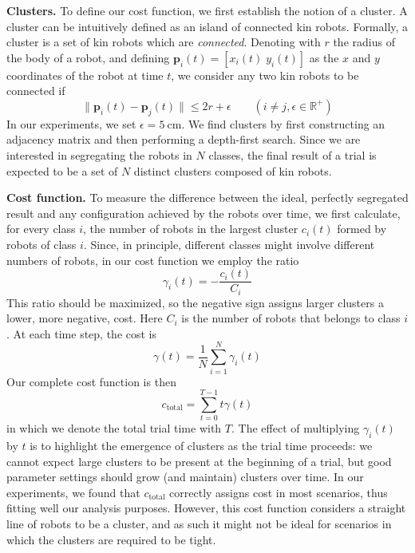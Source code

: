 \documentclass[letterpaper, 10 pt, conference]{ieeeconf}
\newcommand{\myparagraph}[1]{\textbf{#1.}}
\renewcommand{\vec}[1]{\ensuremath{\mathbf{#1}}}
\begin{document}
\myparagraph{Clusters}
To define our cost function, we first establish the notion of a cluster.
A cluster can be intuitively defined as an island of connected kin robots.
Formally, a cluster is a set of kin robots which are \emph{connected}.
Denoting with $r$ the radius of the body of a robot, and defining
$\vec{p}_i(t) = [x_i(t)\;y_i(t)]$ as the $x$ and $y$ coordinates of the robot at time $t$, we consider any two kin robots to be
connected if
\begin{equation} \label{eq:connected}
  \lVert\vec{p}_i(t) - \vec{p}_j(t)\rVert \le 2r + \epsilon \qquad (i \ne j, \epsilon \in \mathbb{R}^+)
\end{equation}
In our experiments, we set $\epsilon = \SI{5}{\centi\meter}$.
We find clusters by first constructing an adjacency matrix and then performing a depth-first search.
Since we are interested in segregating the robots in $N$ classes,
the final result of a trial is expected to be a set of $N$ distinct clusters composed of kin robots.

\myparagraph{Cost function}
To measure the difference between the ideal, perfectly segregated result and any
configuration achieved by the robots over time, we first calculate, for every
class $i$, the number of robots in the largest cluster $c_i(t)$ formed by robots of class $i$. Since,
in principle, different classes might involve different numbers of robots, in
our cost function we employ the ratio
$$
\gamma_i(t) = -\frac{c_i(t)}{C_i}
$$
This ratio should be maximized, so the negative sign assigns larger clusters a lower, more negative, cost.
Here $C_i$ is the number of robots that belongs to class $i$. At each time step, the cost is
$$
\gamma(t) = \frac{1}{N}\sum_{i=1}^N\gamma_i(t)
$$
Our complete cost function is then
\begin{equation}
  \label{eq:cost_function}
  c_{\text{total}} =  \sum_{t=0}^{T-1} t\gamma(t)
\end{equation}
in which we denote the total trial time with $T$. The effect of multiplying $\gamma_i(t)$ by $t$ is to highlight the
emergence of clusters as the trial time proceeds: we cannot expect large
clusters to be present at the beginning of a trial, but good parameter settings
should grow (and maintain) clusters over time. In our experiments, we found that
$c_{\text{total}}$ correctly assigns cost in most scenarios, thus fitting
well our analysis purposes. However, this cost function considers a straight
line of robots to be a cluster, and as such it might not be ideal for scenarios
in which the clusters are required to be tight.
\end{document}

